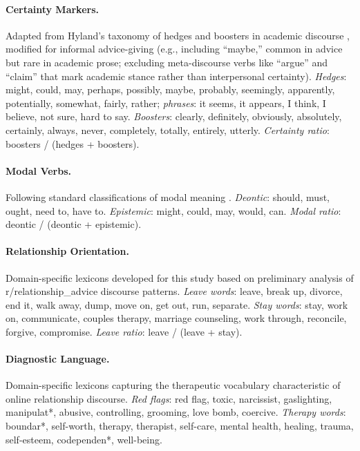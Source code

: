 \paragraph{Certainty Markers.}
Adapted from Hyland's taxonomy of hedges and boosters in academic discourse \citep{hyland2005metadiscourse}, modified for informal advice-giving (e.g., including ``maybe,'' common in advice but rare in academic prose; excluding meta-discourse verbs like ``argue'' and ``claim'' that mark academic stance rather than interpersonal certainty).
\textit{Hedges}: might, could, may, perhaps, possibly, maybe, probably, seemingly, apparently, potentially, somewhat, fairly, rather; \textit{phrases}: it seems, it appears, I think, I believe, not sure, hard to say.
\textit{Boosters}: clearly, definitely, obviously, absolutely, certainly, always, never, completely, totally, entirely, utterly.
\textit{Certainty ratio}: boosters / (hedges + boosters).

\paragraph{Modal Verbs.}
Following standard classifications of modal meaning \citep{palmer2001mood}.
\textit{Deontic}: should, must, ought, need to, have to.
\textit{Epistemic}: might, could, may, would, can.
\textit{Modal ratio}: deontic / (deontic + epistemic).

\paragraph{Relationship Orientation.}
Domain-specific lexicons developed for this study based on preliminary analysis of r/relationship\_advice discourse patterns.
\textit{Leave words}: leave, break up, divorce, end it, walk away, dump, move on, get out, run, separate.
\textit{Stay words}: stay, work on, communicate, couples therapy, marriage counseling, work through, reconcile, forgive, compromise.
\textit{Leave ratio}: leave / (leave + stay).

\paragraph{Diagnostic Language.}
Domain-specific lexicons capturing the therapeutic vocabulary characteristic of online relationship discourse.
\textit{Red flags}: red flag, toxic, narcissist, gaslighting, manipulat*, abusive, controlling, grooming, love bomb, coercive.
\textit{Therapy words}: boundar*, self-worth, therapy, therapist, self-care, mental health, healing, trauma, self-esteem, codependen*, well-being.

